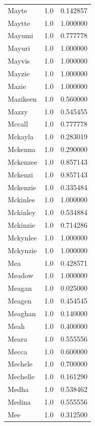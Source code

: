 \documentclass[
  letterpaper,
  DIV=11,
  numbers=noendperiod]{scrreprt}
\begin{document}
\begin{tabular}{lrr}
Mayte           &   1.0 &   0.142857 \\
Maytte          &   1.0 &   1.000000 \\
Mayumi          &   1.0 &   0.777778 \\
Mayuri          &   1.0 &   1.000000 \\
Mayvis          &   1.0 &   1.000000 \\
Mayzie          &   1.0 &   1.000000 \\
Mazie           &   1.0 &   1.000000 \\
Mazikeen        &   1.0 &   0.560000 \\
Mazzy           &   1.0 &   0.545455 \\
Mccall          &   1.0 &   0.777778 \\
Mckayla         &   1.0 &   0.283019 \\
Mckenna         &   1.0 &   0.290000 \\
Mckenzee        &   1.0 &   0.857143 \\
Mckenzi         &   1.0 &   0.857143 \\
Mckenzie        &   1.0 &   0.335484 \\
Mckinlee        &   1.0 &   1.000000 \\
Mckinley        &   1.0 &   0.534884 \\
Mckinzie        &   1.0 &   0.714286 \\
Mckynlee        &   1.0 &   1.000000 \\
Mckynzie        &   1.0 &   1.000000 \\
Mea             &   1.0 &   0.428571 \\
Meadow          &   1.0 &   1.000000 \\
Meagan          &   1.0 &   0.025000 \\
Meagen          &   1.0 &   0.454545 \\
Meaghan         &   1.0 &   0.140000 \\
Meah            &   1.0 &   0.400000 \\
Meara           &   1.0 &   0.555556 \\
Mecca           &   1.0 &   0.600000 \\
Mechele         &   1.0 &   0.700000 \\
Mechelle        &   1.0 &   0.161290 \\
Medha           &   1.0 &   0.538462 \\
Medina          &   1.0 &   0.555556 \\
Mee             &   1.0 &   0.312500 \\

\end{tabular}
\end{document}
